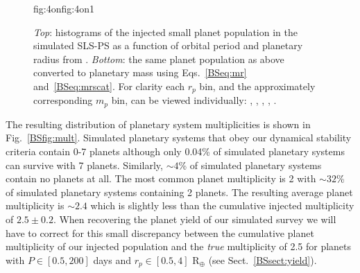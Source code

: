 \begin{figure}
\begin{ocg}{fig:4on}{fig:4on}{1}
  \end{ocg}
  \hspace{-0.8\hsize}%
  \caption[Input planet occurrence rates in the simulated SLS-PS.]
          {\small \emph{Top}: histograms of the injected small planet population in the simulated SLS-PS
    as a function of orbital period and planetary radius from \cite{dressing15a}. \emph{Bottom}:
    the same planet population as above converted to planetary mass using Eqs.~\ref{BSeq:mr}
    and~\ref{BSeq:mrscat}. For clarity each $r_p$ bin, and the approximately corresponding
    $m_p$ bin, can be viewed individually:
    ,
    ,
    ,
    ,
    .}
  \label{BSfig:occurrence}
\end{figure}

The resulting distribution of planetary system multiplicities is shown in Fig.~\ref{BSfig:mult}.
Simulated planetary systems that obey our dynamical stability criteria contain 0-7 planets although only 0.04\%
of simulated planetary systems can survive with 7 planets. Similarly, $\sim 4$\% of simulated planetary systems contain
no planets at all. 
The most common planet multiplicity is 2 with $\sim 32$\% of simulated planetary systems containing 2 planets. The resulting
average planet multiplicity is $\sim 2.4$ which is slightly less than the cumulative injected multiplicity of
$2.5 \pm 0.2$. When
recovering the planet yield of our simulated survey we will have to correct for this small discrepancy between the
cumulative planet multiplicity of our injected population and the \emph{true} multiplicity of 2.5 for planets
with $P \in [0.5,200]$ days and $r_p \in [0.5,4]$ R$_{\oplus}$ (see Sect.~\ref{BSsect:yield}).

